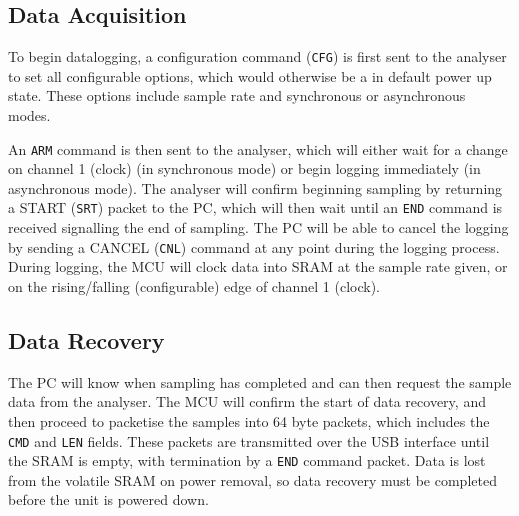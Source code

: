 \subsection{Data Acquisition}
    To begin datalogging, a configuration command (\texttt{CFG}) 
    is first sent to the analyser
    to set all configurable options, which would otherwise be a in default power
    up state. These options include sample rate and synchronous or asynchronous
    modes.

    An \texttt{ARM} command is then sent to the analyser, which will either wait
    for a change on channel 1 (clock) (in synchronous mode) or begin logging
    immediately (in asynchronous mode). The analyser will confirm beginning
    sampling by returning a START (\texttt{SRT}) packet to the PC, which 
    will then
    wait until an \texttt{END} command is received signalling the end of
    sampling. The PC will be able to cancel the logging by sending a CANCEL
    (\texttt{CNL}) command at any point during the logging process. During
    logging, the MCU will clock data into SRAM at the sample rate given, or on
    the rising/falling (configurable) edge of channel 1 (clock).

\subsection{Data Recovery}
    The PC will know when sampling has completed and can then request the sample
    data from the analyser. The MCU will confirm the start of data recovery, and
    then proceed to packetise the samples into 64 byte packets, which includes
    the \texttt{CMD} and \texttt{LEN} fields. These packets are transmitted over
    the USB interface until the SRAM is empty, with termination by a
    \texttt{END} command packet. Data is lost from the volatile SRAM on power
    removal, so data recovery must be completed before the unit is powered down.

